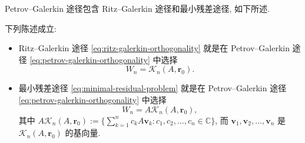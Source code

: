 Petrov--Galerkin 途径包含 Ritz--Galerkin 途径和最小残差途径, 如下所述.

\begin{Proposition}\label{prop:projection-equivalences}
下列陈述成立:
\begin{itemize}
\item Ritz--Galerkin 途径 \eqref{eq:ritz-galerkin-orthogonality} 就是在 Petrov--Galerkin 途径 \eqref{eq:petrov-galerkin-orthogonality} 中选择
\[
W_n=\mathcal K_n(A,\bm r_0).
\]
\item 最小残差途径 \eqref{eq:minimal-residual-problem} 就是在 Petrov--Galerkin 途径 \eqref{eq:petrov-galerkin-orthogonality} 中选择
\begin{equation}\label{eq:minimal-residual-test-space}
W_n=A\mathcal K_n(A,\bm r_0),
\end{equation}
其中 $A\mathcal K_n(A,\bm r_0):=\{\sum_{k=1}^n c_kA\bm v_k:c_1,c_2,\ldots,c_n\in\mathbb C\}$, 而 $\bm v_1,\bm v_2,\ldots,\bm v_n$ 是 $\mathcal K_n(A,\bm r_0)$ 的基向量.
\end{itemize}
\end{Proposition}

